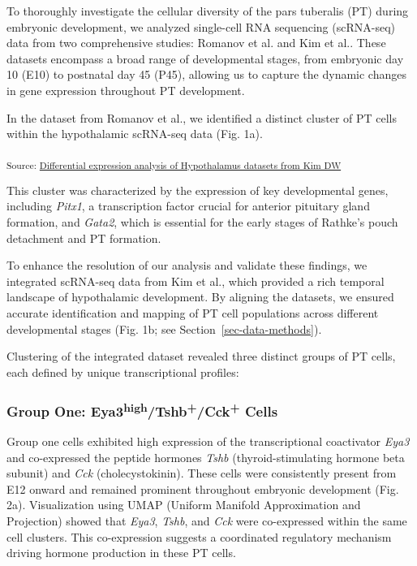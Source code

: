 \documentclass[
  number,
  preprint]{elsarticle}
\begin{document}
To thoroughly investigate the cellular diversity of the pars tuberalis
(PT) during embryonic development, we analyzed single-cell RNA
sequencing (scRNA-seq) data from two comprehensive studies: Romanov et
al.\citep{romanovMolecularDesignHypothalamus2020} and Kim et
al.\citep{kim2020}. These datasets encompass a broad range of
developmental stages, from embryonic day 10 (E10) to postnatal day 45
(P45), allowing us to capture the dynamic changes in gene expression
throughout PT development.

In the dataset from Romanov et al., we identified a distinct cluster of
PT cells within the hypothalamic scRNA-seq data (Fig. 1a).

\textsubscript{Source:
\href{https://EugOT.github.io/pr-PT/notebooks/01-de_test-focus_pars_tub.qmd.html\#cell-fig-feature-romanov2020}{Differential
expression analysis of Hypothalamus datasets from Kim DW}}

This cluster was characterized by the expression of key developmental
genes, including \emph{Pitx1}, a transcription factor crucial for
anterior pituitary gland
formation\citep{szetoPOTXPIT1interactingHomeodomain1996}, and
\emph{Gata2}, which is essential for the early stages of Rathke's pouch
detachment and PT formation\citep{dasenReciprocalInteractionsPit11999}.

To enhance the resolution of our analysis and validate these findings,
we integrated scRNA-seq data from Kim et al., which provided a rich
temporal landscape of hypothalamic development. By aligning the
datasets, we ensured accurate identification and mapping of PT cell
populations across different developmental stages (Fig. 1b; see
Section~\ref{sec-data-methods}).

Clustering of the integrated dataset revealed three distinct groups of
PT cells, each defined by unique transcriptional profiles:

\subsubsection{\texorpdfstring{\textbf{Group One:
Eya3\textsuperscript{high}/Tshb\textsuperscript{+}/Cck\textsuperscript{+}
Cells}}{Group One: Eya3high/Tshb+/Cck+ Cells}}\label{group-one-eya3hightshbcck-cells}

Group one cells exhibited high expression of the transcriptional
coactivator \emph{Eya3} and co-expressed the peptide hormones
\emph{Tshb} (thyroid-stimulating hormone beta subunit) and \emph{Cck}
(cholecystokinin). These cells were consistently present from E12 onward
and remained prominent throughout embryonic development (Fig. 2a).
Visualization using UMAP (Uniform Manifold Approximation and Projection)
showed that \emph{Eya3}, \emph{Tshb}, and \emph{Cck} were co-expressed
within the same cell clusters. This co-expression suggests a coordinated
regulatory mechanism driving hormone production in these PT cells.
\end{document}
